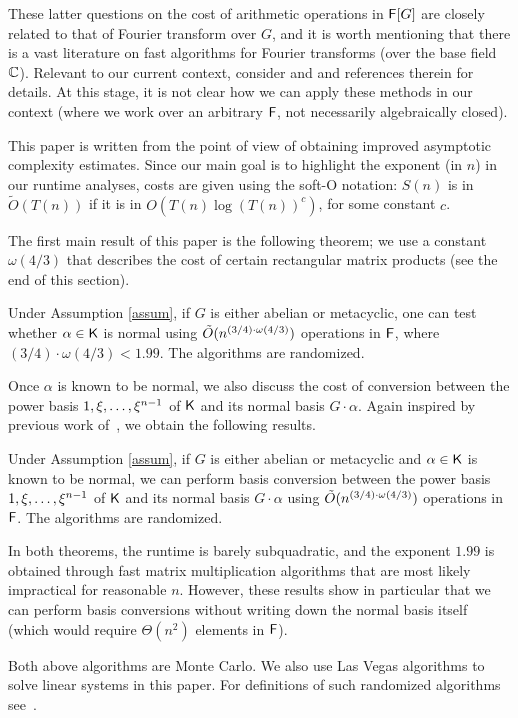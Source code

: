 These latter questions on the cost of arithmetic operations in ${\mathsf{F}}[G]$
are closely related to that of Fourier transform over $G$, and it is
worth mentioning that there is a vast literature on fast algorithms
for Fourier transforms (over the base field $\mathbb{C}$). Relevant to our
current context, consider \citep{ClaMu04} and \citep{MaRockWol18} and
references therein for details. At this stage, it is not clear how we
can apply these methods in our context (where we work over an
arbitrary ${\mathsf{F}}$, not necessarily algebraically closed).

This paper is written from the point of view of obtaining improved
asymptotic complexity estimates. Since our main goal is to highlight
the exponent (in $n$) in our runtime analyses, costs are given using
the soft-O notation: $S(n)$ is in $\tilde{O}(T(n))$ if it is in
$O(T(n) \log(T(n))^c)$, for some constant $c$.

The first main result of this paper is the following theorem; we use a
constant $\omega(4/3)$ that describes the cost of certain rectangular
matrix products (see the end of this section).
\begin{theorem}\label{thm:main}
  Under Assumption \ref{assum}, if $G$ is either abelian or
  metacyclic, one can test whether $\alpha \in {\mathsf{K}}$ is normal using
  $\tilde{O}(n^{(3/4)\cdot \omega(4/3)})$ operations in ${\mathsf{F}}$, where
  $(3/4)\cdot\omega(4/3)<1.99$. The algorithms are randomized.
\end{theorem}
Once $\alpha$ is known to be normal, we also discuss the cost 
of conversion between the power basis $1,\xi,\dots,\xi^{n-1}$
of ${\mathsf{K}}$ and its normal basis $G\cdot \alpha$. Again inspired by
previous work of~\cite{KalSho98}, we obtain the following results.
\begin{theorem}\label{thm:main2}
  Under Assumption \ref{assum}, if $G$ is either abelian or metacyclic
  and $\alpha \in {\mathsf{K}}$ is known to be normal, we can perform basis
  conversion between the power basis $1,\xi,\dots,\xi^{n-1}$ of
  ${\mathsf{K}}$ and its normal basis $G\cdot \alpha$ using $\tilde{O}(n^{(3/4)\cdot \omega(4/3)})$
  operations in ${\mathsf{F}}$. The algorithms are randomized.
\end{theorem}
In both theorems, the runtime is barely subquadratic, and the exponent
$1.99$ is obtained through fast matrix multiplication algorithms that
are most likely impractical for reasonable $n$. However, these results
show in particular that we can perform basis conversions without
writing down the normal basis itself (which would require
$\Theta(n^2)$ elements in ${\mathsf{F}}$).
\begin{remark}
Both above algorithms are Monte Carlo. We also use Las Vegas algorithms
 to solve linear systems in this paper. For definitions of such 
randomized algorithms see~\cite[Section 6.5]{vzGathen13}.
\end{remark}

